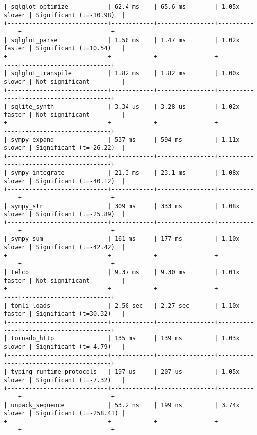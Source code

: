 \begin{code}
\begin{verbatim}
| sqlglot_optimize           | 62.4 ms    | 65.6 ms        | 1.05x slower | Significant (t=-10.98)  |
+----------------------------+------------+----------------+--------------+-------------------------+
| sqlglot_parse              | 1.50 ms    | 1.47 ms        | 1.02x faster | Significant (t=10.54)   |
+----------------------------+------------+----------------+--------------+-------------------------+
| sqlglot_transpile          | 1.82 ms    | 1.82 ms        | 1.00x slower | Not significant         |
+----------------------------+------------+----------------+--------------+-------------------------+
| sqlite_synth               | 3.34 us    | 3.28 us        | 1.02x faster | Not significant         |
+----------------------------+------------+----------------+--------------+-------------------------+
| sympy_expand               | 537 ms     | 594 ms         | 1.11x slower | Significant (t=-26.22)  |
+----------------------------+------------+----------------+--------------+-------------------------+
| sympy_integrate            | 21.3 ms    | 23.1 ms        | 1.08x slower | Significant (t=-40.12)  |
+----------------------------+------------+----------------+--------------+-------------------------+
| sympy_str                  | 309 ms     | 333 ms         | 1.08x slower | Significant (t=-25.89)  |
+----------------------------+------------+----------------+--------------+-------------------------+
| sympy_sum                  | 161 ms     | 177 ms         | 1.10x slower | Significant (t=-42.42)  |
+----------------------------+------------+----------------+--------------+-------------------------+
| telco                      | 9.37 ms    | 9.30 ms        | 1.01x faster | Not significant         |
+----------------------------+------------+----------------+--------------+-------------------------+
| tomli_loads                | 2.50 sec   | 2.27 sec       | 1.10x faster | Significant (t=30.32)   |
+----------------------------+------------+----------------+--------------+-------------------------+
| tornado_http               | 135 ms     | 139 ms         | 1.03x slower | Significant (t=-4.79)   |
+----------------------------+------------+----------------+--------------+-------------------------+
| typing_runtime_protocols   | 197 us     | 207 us         | 1.05x slower | Significant (t=-7.32)   |
+----------------------------+------------+----------------+--------------+-------------------------+
| unpack_sequence            | 53.2 ns    | 199 ns         | 3.74x slower | Significant (t=-258.41) |
+----------------------------+------------+----------------+--------------+-------------------------+

\end{verbatim}
\end{code}
